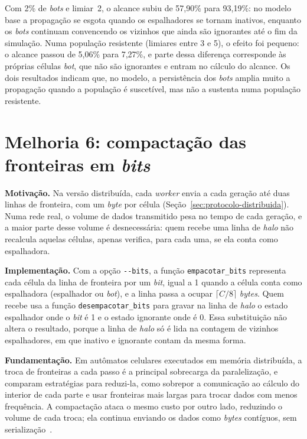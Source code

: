 Com 2\% de \textit{bots} e limiar~2, o alcance subiu de 57,90\% para 93,19\%: no modelo base a propagação se esgota quando os espalhadores se tornam inativos, enquanto os \textit{bots} continuam convencendo os vizinhos que ainda são ignorantes até o fim da simulação. Numa população resistente (limiares entre 3 e 5), o efeito foi pequeno: o alcance passou de 5,06\% para 7,27\%, e parte dessa diferença corresponde às próprias células \textit{bot}, que não são ignorantes e entram no cálculo do alcance. Os dois resultados indicam que, no modelo, a persistência dos \textit{bots} amplia muito a propagação quando a população é suscetível, mas não a sustenta numa população resistente.

\section{Melhoria 6: compactação das fronteiras em \textit{bits}}\label{sec:melhoria-bits}

\textbf{Motivação.} Na versão distribuída, cada \textit{worker} envia a cada geração até duas linhas de fronteira, com um \textit{byte} por célula (Seção~\ref{sec:protocolo-distribuida}). Numa rede real, o volume de dados transmitido pesa no tempo de cada geração, e a maior parte desse volume é desnecessária: quem recebe uma linha de \textit{halo} não recalcula aquelas células, apenas verifica, para cada uma, se ela conta como espalhadora.

\textbf{Implementação.} Com a opção \texttt{-{}-bits}, a função \texttt{empacotar\_bits} representa cada célula da linha de fronteira por um \textit{bit}, igual a 1 quando a célula conta como espalhadora (espalhador ou \textit{bot}), e a linha passa a ocupar $\lceil C/8 \rceil$ \textit{bytes}. Quem recebe usa a função \texttt{desempacotar\_bits} para gravar na linha de \textit{halo} o estado espalhador onde o \textit{bit} é 1 e o estado ignorante onde é 0. Essa substituição não altera o resultado, porque a linha de \textit{halo} só é lida na contagem de vizinhos espalhadores, em que inativo e ignorante contam da mesma forma.

\textbf{Fundamentação.} Em autômatos celulares executados em memória distribuída, a troca de fronteiras a cada passo é a principal sobrecarga da paralelização, e  comparam estratégias para reduzi-la, como sobrepor a comunicação ao cálculo do interior de cada parte e usar fronteiras mais largas para trocar dados com menos frequência. A compactação ataca o mesmo custo por outro lado, reduzindo o volume de cada troca; ela continua enviando os dados como \textit{bytes} contíguos, sem serialização~\cite{Dalcin2011}.

